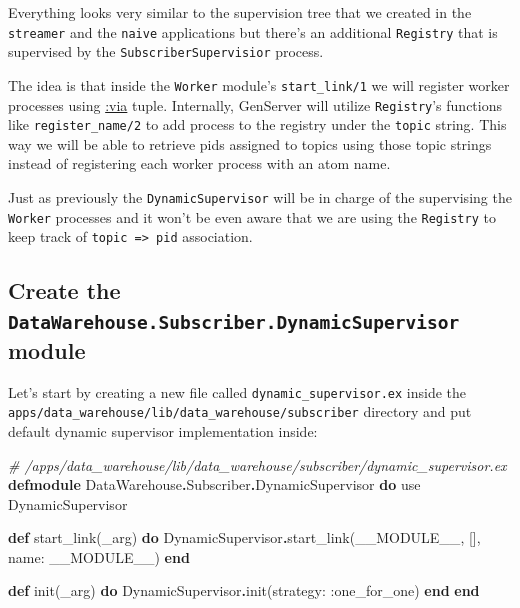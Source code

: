 \documentclass[
  oneside]{book}
\newenvironment{Shaded}{\begin{snugshade}}{\end{snugshade}}
\newcommand{\CommentTok}[1]{\textcolor[rgb]{0.56,0.35,0.01}{\textit{#1}}}
\newcommand{\ConstantTok}[1]{\textcolor[rgb]{0.00,0.00,0.00}{#1}}
\newcommand{\ImportTok}[1]{#1}
\newcommand{\KeywordTok}[1]{\textcolor[rgb]{0.13,0.29,0.53}{\textbf{#1}}}
\newcommand{\NormalTok}[1]{#1}
\newcommand{\OperatorTok}[1]{\textcolor[rgb]{0.81,0.36,0.00}{\textbf{#1}}}
\newcommand{\VariableTok}[1]{\textcolor[rgb]{0.00,0.00,0.00}{#1}}
\begin{document}
Everything looks very similar to the supervision tree that we created in the \texttt{streamer} and the \texttt{naive} applications but there's an additional \texttt{Registry} that is supervised by the \texttt{SubscriberSupervisior} process.

The idea is that inside the \texttt{Worker} module's \texttt{start\_link/1} we will register worker processes using \href{https://hexdocs.pm/elixir/master/GenServer.html\#module-name-registration}{:via} tuple. Internally, GenServer will utilize \texttt{Registry}'s functions like \texttt{register\_name/2} to add process to the registry under the \texttt{topic} string. This way we will be able to retrieve pids assigned to topics using those topic strings instead of registering each worker process with an atom name.

Just as previously the \texttt{DynamicSupervisor} will be in charge of the supervising the \texttt{Worker} processes and it won't be even aware that we are using the \texttt{Registry} to keep track of \texttt{topic\ =\textgreater{}\ pid} association.

\hypertarget{create-the-datawarehouse.subscriber.dynamicsupervisor-module}{%
\subsection{\texorpdfstring{Create the \texttt{DataWarehouse.Subscriber.DynamicSupervisor} module}{Create the DataWarehouse.Subscriber.DynamicSupervisor module}}\label{create-the-datawarehouse.subscriber.dynamicsupervisor-module}}

Let's start by creating a new file called \texttt{dynamic\_supervisor.ex} inside the \texttt{apps/data\_warehouse/lib/data\_warehouse/subscriber} directory and put default dynamic supervisor implementation inside:

\begin{Shaded}
\begin{Highlighting}[]
\CommentTok{\# /apps/data\_warehouse/lib/data\_warehouse/subscriber/dynamic\_supervisor.ex}
\KeywordTok{defmodule} \ConstantTok{DataWarehouse}\OperatorTok{.}\ConstantTok{Subscriber}\OperatorTok{.}\ConstantTok{DynamicSupervisor} \KeywordTok{do}
  \ImportTok{use} \ConstantTok{DynamicSupervisor}

  \KeywordTok{def}\NormalTok{ start\_link(\_arg) }\KeywordTok{do}
    \ConstantTok{DynamicSupervisor}\OperatorTok{.}\NormalTok{start\_link(}\ConstantTok{\_\_MODULE\_\_}\NormalTok{, [], }\VariableTok{name:} \ConstantTok{\_\_MODULE\_\_}\NormalTok{)}
  \KeywordTok{end}

  \KeywordTok{def}\NormalTok{ init(\_arg) }\KeywordTok{do}
    \ConstantTok{DynamicSupervisor}\OperatorTok{.}\NormalTok{init(}\VariableTok{strategy:} \VariableTok{:one\_for\_one}\NormalTok{)}
  \KeywordTok{end}
\KeywordTok{end}
\end{Highlighting}
\end{Shaded}
\end{document}
